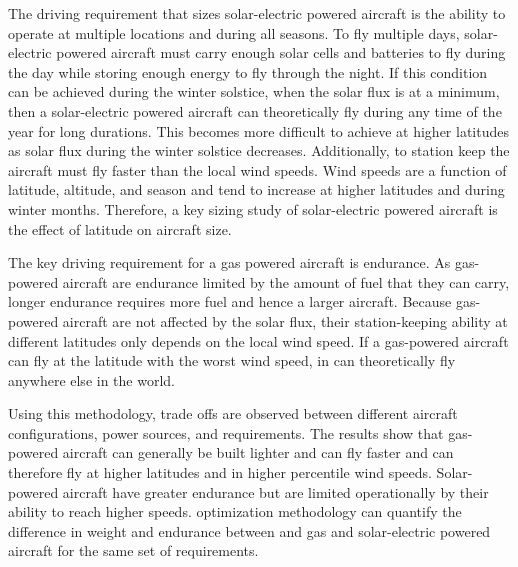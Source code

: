 The driving requirement that sizes solar-electric powered aircraft is the ability to operate at multiple locations and during all seasons.  
To fly multiple days, solar-electric powered aircraft must carry enough solar cells and batteries to fly during the day while storing enough energy to fly through the night.\cite{solartech}
If this condition can be achieved during the winter solstice, when the solar flux is at a minimum, then a solar-electric powered aircraft can theoretically fly during any time of the year for long durations. \cite{solartech}
This becomes more difficult to achieve at higher latitudes as solar flux during the winter solstice decreases.  
Additionally, to station keep the aircraft must fly faster than the local wind speeds.  
Wind speeds are a function of latitude, altitude, and season and tend to increase at higher latitudes and during winter months. 
Therefore, a key sizing study of solar-electric powered aircraft is the effect of latitude on aircraft size.  

The key driving requirement for a gas powered aircraft is endurance.  
As gas-powered aircraft are endurance limited by the amount of fuel that they can carry, longer endurance requires more fuel and hence a larger aircraft.  
Because gas-powered aircraft are not affected by the solar flux, their station-keeping ability at different latitudes only depends on the local wind speed. 
If a gas-powered aircraft can fly at the latitude with the worst wind speed, in can theoretically fly anywhere else in the world.  

Using this \DIFaddbegin {}\DIFaddend methodology, trade offs are observed between different aircraft configurations, power sources, and requirements.  
The results show that gas-powered aircraft can generally be built lighter and can fly faster and can therefore fly at higher latitudes and in higher percentile wind speeds.  
Solar-powered aircraft have greater endurance but are limited operationally by their ability to reach higher speeds.  
\DIFdelbegin {}\DIFdelend \DIFaddbegin {}\DIFaddend optimization methodology can quantify the difference in weight and endurance between and gas and solar-electric powered aircraft for the same set of requirements. 
\DIFdelbegin {}\DIFdelend \DIFaddbegin {}

